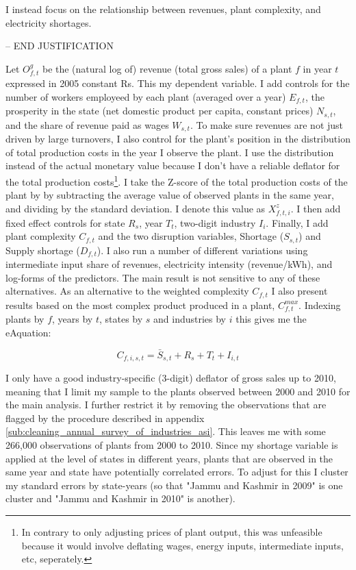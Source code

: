 \documentclass[11pt]{article}
\begin{document}
I instead focus on the relationship between revenues, plant complexity, and electricity shortages.

-- END JUSTIFICATION

Let $O^{g}_{f,t}$ be the (natural log of) revenue (total gross sales) of a plant $f$ in year $t$ expressed in 2005 constant Rs. This my dependent variable. I add controls for the number of workers employeed by each plant (averaged over a year) $E_{f,t}$, the prosperity in the state (net domestic product per capita, constant prices) $N_{s,t}$, and the share of revenue paid as wages $W_{s,t}$. To make sure revenues are not just driven by large turnovers, I also control for the plant's position in the distribution of total production costs in the year I observe the plant. I use the distribution instead of the actual monetary value because I don't have a reliable deflator for the total production costs\footnote{In contrary to only adjusting prices of plant output, this was unfeasible because it would involve deflating wages, energy inputs, intermediate inputs, etc, seperately.}. I take the Z-score of the total production costs of the plant by by subtracting the average value of observed plants in the same year, and dividing by the standard deviation. I denote this value as $X^{z}_{f,t,i}$. I then add fixed effect controls for state $R_{s}$, year $T_{t}$, two-digit industry $I_i$. Finally, I add plant complexity $C_{f,t}$ and the two disruption variables, Shortage ($S_{s,t}$) and Supply shortage ($D_{f,t}$). I also run a number of different variations using intermediate input share of revenues, electricity intensity (revenue/kWh), and log-forms of the predictors. The main result is not sensitive to any of these alternatives. As an alternative to the weighted complexity $C_{f,t}$ I also present results based on the most complex product produced in a plant, $C^{max}_{f,t}$. Indexing plants by $f$, years by $t$, states by $s$ and industries by $i$ this gives me the eAquation:

\begin{equation}
\label{eqn:entry}
	C_{f,i,s,t} = \bar{S}_{s,t} + R_{s} + T_{t} + I_{i,t} 
\end{equation}

I only have a good industry-specific (3-digit) deflator of gross sales up to 2010, meaning that I limit my sample to the plants observed between 2000 and 2010 for the main analysis. I further restrict it by removing the observations that are flagged by the procedure described in appendix \ref{sub:cleaning_annual_survey_of_industries_asi}. This leaves me with some 266,000 observations of plants from 2000 to 2010. Since my shortage variable is applied at the level of states in different years, plants that are observed in the same year and state have potentially correlated errors. To adjust for this I cluster my standard errors by state-years (so that "Jammu and Kashmir in 2009" is one cluster and "Jammu and Kashmir in 2010" is another). 
\end{document}
